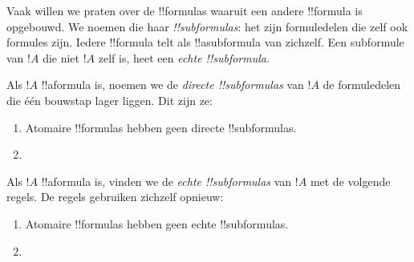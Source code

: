 \documentclass[../../../include/open-logic-section]{subfiles}
\begin{document}


\begin{explain}
Vaak willen we praten over de !!{formula}s waaruit een andere
!!{formula} is opgebouwd. We noemen die haar \emph{!!{subformula}s}:
het zijn formuledelen die zelf ook formules zijn. Iedere !!{formula}
telt als !!a{subformula} van zichzelf. Een subformule van $!A$ die niet
$!A$ zelf is, heet een \emph{echte !!{subformula}}.
\end{explain}

\begin{defn}
Als $!A$ !!a{formula} is, noemen we de \emph{directe
!!{subformula}s} van $!A$ de formuledelen die één bouwstap lager
liggen. Dit zijn ze:
\begin{enumerate}
\item Atomaire !!{formula}s hebben geen directe !!{subformula}s.


\item {}


\end{enumerate}
\end{defn}

\begin{defn}
Als $!A$ !!a{formula} is, vinden we de \emph{echte !!{subformula}s}
van $!A$ met de volgende regels. De regels gebruiken zichzelf opnieuw:
\begin{enumerate}
\item Atomaire !!{formula}s hebben geen echte !!{subformula}s.


\item {}


\end{enumerate}
\end{defn}
\end{document}
